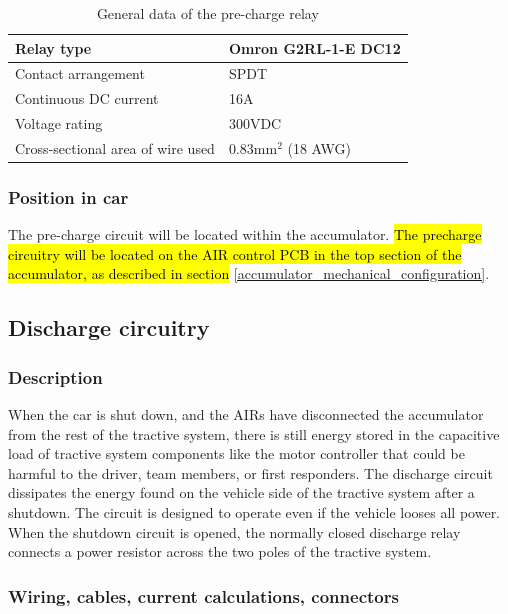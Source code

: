 \documentclass{article}
\DeclareRobustCommand{\hlr}[1]{{\sethlcolor{pink}\hl{#1}}}
\begin{document}
	\begin{table}[H]
	    \centering
	    \begin{tabular}{|l|l|}
	    \hline
	    Relay type & Omron G2RL-1-E DC12 \\ \hline
	    Contact arrangement & SPDT \\ \hline
	    Continuous DC current & 16A \\ \hline
	    Voltage rating & 300VDC \\ \hline
	    Cross-sectional area of wire used & 0.83mm$^2$ (18 AWG) \\ \hline
	    \end{tabular}
	    \caption{General data of the pre-charge relay}
	    \label{PCrelay}
	\end{table}

\subsubsection{Position in car}
The pre-charge circuit will be located within the accumulator. \hlr{The precharge circuitry will be located on the AIR control PCB in the top section of the accumulator, as described in section }\ref{accumulator_mechanical_configuration}.

\subsection{Discharge circuitry}\label{discharge_circuitry}
\subsubsection{Description}
When the car is shut down, and the AIRs have disconnected the accumulator from the rest of the tractive system, there is still energy stored in the capacitive load of tractive system components like the motor controller that could be harmful to the driver, team members, or first responders. The discharge circuit dissipates the energy found on the vehicle side of the tractive system after a shutdown. The circuit is designed to operate even if the vehicle looses all power. When the shutdown circuit is opened, the normally closed discharge relay connects a power resistor across the two poles of the tractive system.  

\subsubsection{Wiring, cables, current calculations, connectors}
\end{document}
